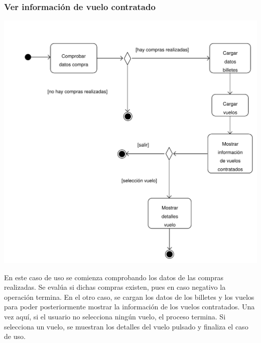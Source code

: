 \documentclass[11pt, a4paper, twoside, titlepage]{article}
\begin{document}
			\subsubsection{Ver información de vuelo contratado}
				\begin{center}
					\includegraphics[scale=.8]{analisis/diagramas/da_verinfovuelocontratado.pdf}
				\end{center}
				En este caso de uso se comienza comprobando los datos de las compras realizadas. Se evalúa si dichas compras existen, pues en caso negativo la operación termina. En el otro caso, se cargan los datos de los billetes y los vuelos para poder posteriormente mostrar la información de los vuelos contratados. Una vez aquí, si el usuario no selecciona ningún vuelo, el proceso termina. Si selecciona un vuelo, se muestran los detalles del vuelo pulsado y finaliza el caso de uso.

	\newpage
	
\end{document}
